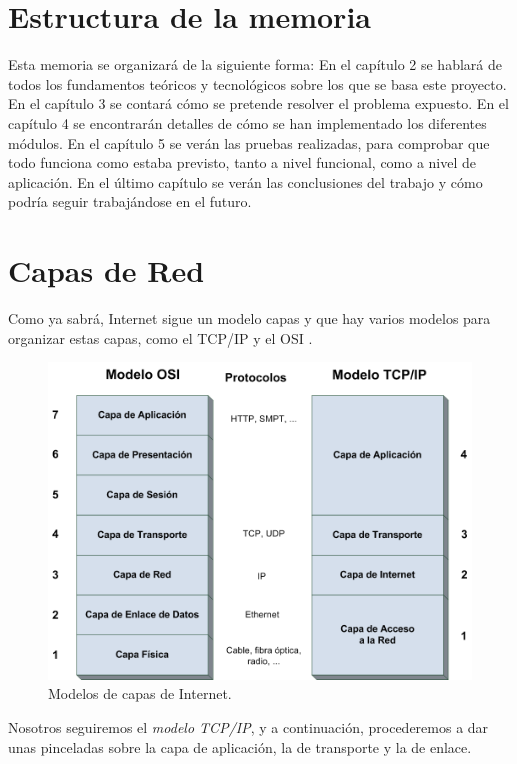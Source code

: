 \section{Estructura de la memoria}

Esta memoria se organizará de la siguiente forma: En el capítulo 2 se hablará de 
todos los fundamentos teóricos y tecnológicos sobre los que se basa este proyecto. 
En el capítulo 3 se contará cómo se pretende resolver el problema expuesto. En el 
capítulo 4 se encontrarán detalles de cómo se han implementado los diferentes módulos. 
En el capítulo 5 se verán las pruebas realizadas, para comprobar que todo funciona como 
estaba previsto, tanto a nivel funcional, como a nivel de aplicación. En el último capítulo 
se verán las conclusiones del trabajo y cómo podría seguir trabajándose en el futuro.



\section{Capas de Red}

Como ya sabrá, Internet sigue un modelo capas y que hay varios modelos para 
organizar estas capas, como el TCP/IP y el OSI \cite{redes2010}.

\begin{figure}[H]
  \includegraphics[width=1\textwidth]{imagenes/capas.png}
  \centering
  \caption{Modelos de capas de Internet.}
\end{figure}

\noindent Nosotros seguiremos el \textit{modelo TCP/IP}, y a continuación, procederemos a dar 
unas pinceladas sobre la capa de aplicación, la de transporte y la de enlace.

